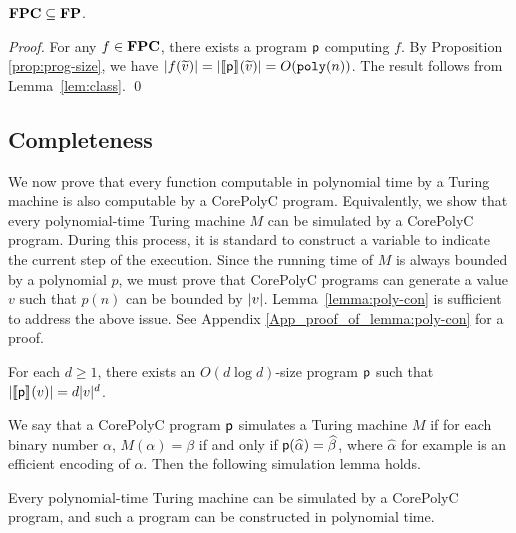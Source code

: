 \documentclass[runningheads]{llncs}
\begin{document}
\begin{theorem}[Soundness]
\label{thm:soundness}
$\mathbf{FPC}\subseteq\mathbf{FP}$.
\end{theorem}
\begin{proof}
    For any $f\in\mathbf{FPC}$, there exists a program $\mathsf{p}$ computing $f$.
    By Proposition \ref{prop:prog-size}, we have $\vert f(\widetilde{v})\vert=\vert\llbracket\mathsf{p}\rrbracket_{}(\widetilde{v})\vert=O(\mathtt{poly}(n))$.
    The result follows from Lemma~\ref{lem:class}.
    \qed
\end{proof}

\subsection{Completeness}\label{sec-Completeness}
We now prove that every function computable in polynomial time by a Turing machine is also computable by a CorePolyC program.
Equivalently, we show that every polynomial-time Turing machine $M$ can be simulated by a CorePolyC program.
During this process, it is standard to construct a variable to indicate the current step of the execution.
Since the running time of $M$ is always bounded by a polynomial $p$, we must prove that CorePolyC programs can generate a value $v$ such that $p(n)$ can be bounded by $\vert v\vert$.
Lemma~\ref{lemma:poly-con} is sufficient to address the above issue. See Appendix \ref{App_proof_of_lemma:poly-con} for a proof.
\begin{lemma}
\label{lemma:poly-con}
For each $d\geq 1$, there exists an $O(d\log d)$-size program $\mathsf{p}$ such that $\vert\llbracket\mathsf{p}\rrbracket_{}{(v)}\vert= d\vert v\vert^d$.
\end{lemma}
We say that a CorePolyC program $\mathsf{p}$ simulates a Turing machine $M$ if for each binary number $\alpha$, $M(\alpha)=\beta$ if and only if $\mathsf{p}(\widehat{\alpha})=\widehat{\beta}$, where $\widehat{\alpha}$ for example is an efficient encoding of $\alpha$.
Then the following simulation lemma holds.
\begin{lemma}
\label{lem:simulate}
Every polynomial-time Turing machine can be simulated by a CorePolyC program, and such a program can be constructed in polynomial time.
\end{lemma}
\end{document}
